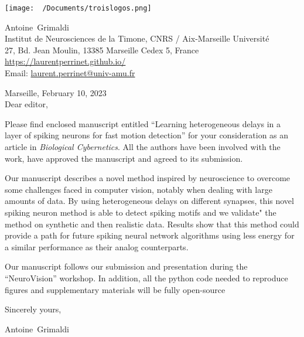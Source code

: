 \documentclass[10pt,english]{article}
\makeatletter
\newcommand{\LastName}{Grimaldi}%
\newcommand{\FirstName}{Antoine}%
\newcommand{\Institute}{Institut de Neurosciences de la Timone, CNRS / Aix-Marseille Universit\'e}%
\newcommand{\Address}{27, Bd. Jean Moulin, 13385 Marseille Cedex 5, France}%
\newcommand{\Website}{\url{https://laurentperrinet.github.io/}}%
\newcommand{\Email}{\url{laurent.perrinet@univ-amu.fr}}%
\makeatother
\begin{document}
\texttt{[image: ~/Documents/troislogos.png]}
\\
\vspace{.1\baselineskip}
\hrulefill
\vspace{.1\baselineskip}

\begin{flushright}
	\FirstName\  \LastName\  \\
	\Institute\\[6pt]
	\Address\\%
	\Website \\
	  Email: \Email \\[6pt]
\end{flushright}
\justifying
\vspace{1\baselineskip}
Marseille, 
February 10, 2023%
\\[12pt] %
	
Dear editor,

Please find enclosed manuscript entitled ``Learning heterogeneous delays in a layer of spiking neurons for fast motion detection'' for your consideration as an article in \emph{Biological Cybernetics}. All the authors have been involved with the work, have approved the manuscript and agreed to its submission.

Our manuscript describes a novel method inspired by neuroscience to overcome some challenges faced in computer vision, notably when dealing with large amounts of data. By using heterogeneous delays on different synapses, this novel spiking neuron method is able to detect spiking motifs and we validate" the method on synthetic and then realistic data. Results show that this method could provide a path for future spiking neural network algorithms using less energy for a similar performance as their analog counterparts.

Our  manuscript follows our submission and presentation during the ``NeuroVision'' workshop. In addition, all the python code needed to reproduce figures and supplementary materials will be fully open-source

Sincerely yours,%

\FirstName\ \LastName \\

\end{document}
